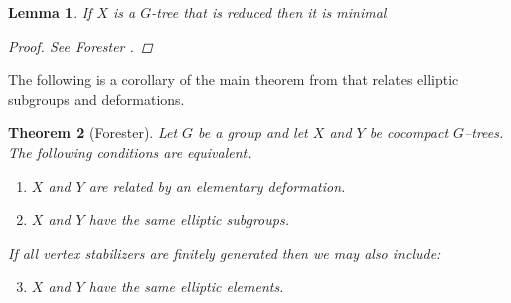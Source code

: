 \documentclass[12pt,parskip=full]{report}
\theoremstyle{plain}
\newtheorem{thm}{Theorem}[section]
\newtheorem{lem}[thm]{Lemma}
\theoremstyle{definition}
\begin{document}

\begin{lem}
    \label{reducedcocompact}
    If \(X\) is a \(G\)-tree that is reduced then it is minimal
    \begin{proof}
        See Forester \cite{foresterdeformationrigidity}.
    \end{proof}
\end{lem}

The following is a corollary of the main theorem from \cite{foresterdeformationrigidity} that relates elliptic subgroups and deformations.

\begin{thm} [Forester]
    \label{thm:forester}
    Let \(G\) be a group and let \(X\) and \(Y\) be cocompact \(G\)–trees. The following conditions are equivalent.
    \begin{enumerate}
        \item \(X\) and \(Y\) are related by an elementary deformation. 
        \item \(X\) and \(Y\) have the same elliptic subgroups.
    \end{enumerate}
If all vertex stabilizers are finitely generated then we may also include:
\begin{enumerate}
    \setcounter{enumi}{2}
    \item \(X\) and \(Y\) have the same elliptic elements.
\end{enumerate}
\end{thm}
\end{document}
